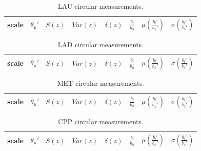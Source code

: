 \documentclass[%
 aip,
 jmp,%
 amsmath,amssymb,
 reprint,%
 floatfix,
]{revtex4-1}
\begin{document}
\begin{table}[!h]
	\caption{LAU circular measurements.}
\begin{center}
    \begin{tabular}{ |l|| c|c|c|c|c||c|c| }
        \hline
    scale & $\theta_\mu'$ & $S(z)$ & $Var(z)$ & $\delta(z)$ & $\frac{b_l}{b_h}$ & $ \mu(\frac{b_l'}{b_h'}) $ & $ \sigma(\frac{b_l'}{b_h'}) $ \\ \hline
	
    \end{tabular}
\end{center}
\label{tab:circLau}
\end{table}
\begin{table}[!h]
	\caption{LAD circular measurements.}
\begin{center}
    \begin{tabular}{ |l|| c|c|c|c|c||c|c| }
        \hline
        scale & $\theta_\mu'$ & $S(z)$ & $Var(z)$ & $\delta(z)$ & $\frac{b_l}{b_h}$ & $ \mu(\frac{b_l'}{b_h'}) $ & $ \sigma(\frac{b_l'}{b_h'}) $ \\ \hline
	
    \end{tabular}
\end{center}
\label{tab:circLad}
\end{table}
\begin{table}[!h]
	\caption{MET circular measurements.}
\begin{center}
    \begin{tabular}{ |l|| c|c|c|c|c||c|c| }
        \hline
        scale & $\theta_\mu'$ & $S(z)$ & $Var(z)$ & $\delta(z)$ & $\frac{b_l}{b_h}$ & $ \mu(\frac{b_l'}{b_h'}) $ & $ \sigma(\frac{b_l'}{b_h'}) $ \\ \hline
	
    \end{tabular}
\end{center}
\label{tab:circMet}
\end{table}
\begin{table}[!h]
	\caption{CPP circular measurements.}
\begin{center}
    \begin{tabular}{ |l|| c|c|c|c|c||c|c| }
        \hline
        scale & $\theta_\mu'$ & $S(z)$ & $Var(z)$ & $\delta(z)$ & $\frac{b_l}{b_h}$ & $ \mu(\frac{b_l'}{b_h'}) $ & $ \sigma(\frac{b_l'}{b_h'})$ \\ \hline
	
    \end{tabular}
\end{center}
\label{tab:circCPP}
\end{table}
\end{document}
